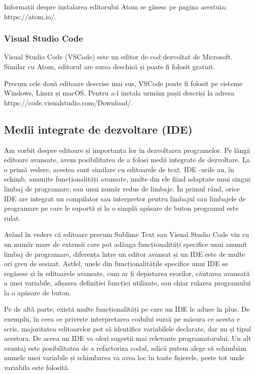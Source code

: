 Informații despre instalarea editorului Atom se găsesc pe pagina acestuia:
https://atom.io/.

\subsubsection{Visual Studio Code}
\label{sec:appdev:dev:editor-gui:vscode}

Visual Studio Code (VSCode) este un editor de cod dezvoltat de Microsoft.
Similar cu Atom, editorul are sursa deschisă și poate fi folosit gratuit.

Precum cele două editoare descrise mai sus, VSCode poate fi folosit pe sisteme
Windows, Linux și macOS. Pentru a-l instala urmăm pașii descriși la
adresa https://code.visualstudio.com/Download/.

\subsection{Medii integrate de dezvoltare (IDE)}
\label{sec:appdev:dev:ide}

Am vorbit despre editoare și importanța lor în dezvoltarea programelor. Pe lângă
editoare avansate, avem posibilitatea de a folosi medii integrate de dezvoltare.
La o primă vedere, acestea sunt similare cu editoarele de text. IDE
-urile au, în schimb, anumite
funcționalități avansate, multe din ele fiind adaptate unui singur limbaj de
programare, sau unui număr redus de limbaje. În primul rând, orice IDE are
integrat un compilator sau interpretor pentru limbajul sau limbajele de
programare pe care le suportă și la o simplă apăsare de buton programul este
rulat.

Având în vedere că editoare precum Sublime Text sau Visual Studio Code vin cu un
număr mare de extensii care pot adăuga funcționalități specifice unui anumit
limbaj de programare, diferența între un editor avansat și un IDE este de multe
ori greu de sesizat. Astfel, unele din funcționalitățile specifice unui IDE se
regăsesc și în editoarele avansate, cum ar fi depistarea erorilor, căutarea
avansată a unei variabile, afișarea definiției funcției utilizate, sau chiar
rularea programului la o apăsare de buton.

Pe de altă parte, există multe funcționalități pe care un IDE le aduce în plus.
De exemplu, în ceea ce privește interpretarea codului sursă pe măsura ce acesta
e scris, majoritatea editoarelor pot să identifice variabilele declarate, dar nu
și tipul acestora. De aceea un IDE va oferi sugestii mai relevante
programatorului. Un alt avantaj este posibilitatea de a refactoriza codul, adică
putem alege să schimbăm numele unei variabile și schimbarea va avea loc în toate
fișierele, peste tot unde variabila este folosită.

